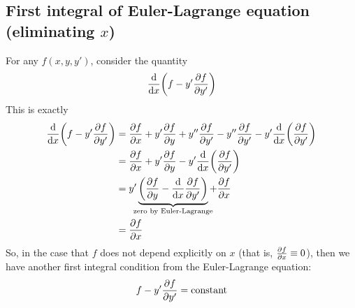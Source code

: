 \subsection{First integral of Euler-Lagrange equation (eliminating \(x\))}
For any \( f (x, y, y') \), consider the quantity
\[
	\dv{x}\qty(f - y' \pdv{f}{y'})
\]
This is exactly
\begin{align*}
	\dv{x}\qty(f - y' \pdv{f}{y'}) & = \pdv{f}{x} + y' \pdv{f}{y} + y''\pdv{f}{y'} - y'' \pdv{f}{y'} - y' \dv{x}\qty(\pdv{f}{y'})                     \\
	                               & = \pdv{f}{x} + y' \pdv{f}{y} - y' \dv{x}\qty(\pdv{f}{y'})                                                        \\
	                               & = y' \underbrace{\qty( \pdv{f}{y} - \dv{x}\pdv{f}{y'} )}_{\mathclap{\text{zero by Euler-Lagrange}}} + \pdv{f}{x} \\
	                               & = \pdv{f}{x}                                                                                                     \\
\end{align*}
So, in the case that \( f \) does not depend explicitly on \( x \) (that is, \( \pdv{f}{x} \equiv 0 \)), then we have another first integral condition from the Euler-Lagrange equation:
\[
	f - y' \pdv{f}{y'} = \text{constant}
\]

